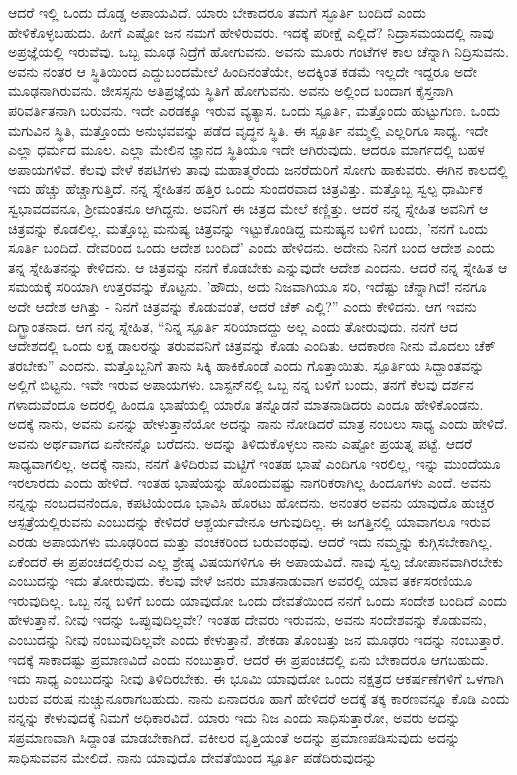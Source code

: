 ಆದರೆ ಇಲ್ಲಿ ಒಂದು ದೊಡ್ಡ ಅಪಾಯವಿದೆ. ಯಾರು ಬೇಕಾದರೂ ತಮಗೆ ಸ್ಫೂರ್ತಿ ಬಂದಿದೆ ಎಂದು ಹೇಳಿಕೊಳ್ಳಬಹುದು. ಹೀಗೆ ಎಷ್ಟೋ ಜನ ನಮಗೆ ಹೇಳಿರುವರು. ಇದಕ್ಕೆ ಪರೀಕ್ಷೆ ಎಲ್ಲಿದೆ? ನಿದ್ರಾಸಮಯದಲ್ಲಿ ನಾವು ಅಪ್ರಜ್ಞೆಯಲ್ಲಿ ಇರುವೆವು. ಒಬ್ಬ ಮೂಢ ನಿದ್ರೆಗೆ ಹೋಗುವನು. ಅವನು ಮೂರು ಗಂಟೆಗಳ ಕಾಲ ಚೆನ್ನಾಗಿ ನಿದ್ರಿಸುವನು. ಅವನು ನಂತರ ಆ ಸ್ಥಿತಿಯಿಂದ ಎದ್ದುಬಂದಮೇಲೆ ಹಿಂದಿನಂತೆಯೇ, ಅದಕ್ಕಿಂತ ಕಡಮೆ ಇಲ್ಲದೇ ಇದ್ದರೂ ಅದೇ ಮೂಢನಾಗಿರುವನು. ಜೀಸಸ್ಸನು ಅತಿಪ್ರಜ್ಞೆಯ ಸ್ಥಿತಿಗೆ ಹೋಗುವನು. ಅವನು ಅಲ್ಲಿಂದ ಬಂದಾಗ ಕೈಸ್ತನಾಗಿ ಪರಿವರ್ತಿತನಾಗಿ ಬರುವನು. ಇದೇ ಎರಡಕ್ಕೂ ಇರುವ ವ್ಯತ್ಯಾಸ. ಒಂದು ಸ್ಪೂರ್ತಿ, ಮತ್ತೊಂದು ಹುಟ್ಟುಗುಣ. ಒಂದು ಮಗುವಿನ ಸ್ಥಿತಿ, ಮತ್ತೊಂದು ಅನುಭವವನ್ನು ಪಡೆದ ವೃದ್ಧನ ಸ್ಥಿತಿ. ಈ ಸ್ಪೂರ್ತಿ ನಮ್ಮಲ್ಲಿ ಎಲ್ಲರಿಗೂ ಸಾಧ್ಯ. ಇದೇ ಎಲ್ಲಾ ಧರ್ಮದ ಮೂಲ. ಎಲ್ಲಾ ಮೇಲಿನ ಜ್ಞಾನದ ಸ್ಥಿತಿಯೂ ಇದೇ ಆಗಿರುವುದು. ಆದರೂ ಮಾರ್ಗದಲ್ಲಿ ಬಹಳ ಅಪಾಯಗಳಿವೆ. ಕೆಲವು ವೇಳೆ ಕಪಟಿಗಳು ತಾವು ಮಹಾತ್ಮರೆಂದು ಜನರೆದುರಿಗೆ ಸೋಗು ಹಾಕುವರು. ಈಗಿನ ಕಾಲದಲ್ಲಿ ಇದು ಹೆಚ್ಚು ಹೆಚ್ಚಾಗುತ್ತಿದೆ. ನನ್ನ ಸ್ನೇಹಿತನ ಹತ್ತಿರ ಒಂದು ಸುಂದರವಾದ ಚಿತ್ರವಿತ್ತು. ಮತ್ತೊಬ್ಬ ಸ್ವಲ್ಪ ಧಾರ್ಮಿಕ ಸ್ವಭಾವದವನೂ, ಶ‍್ರೀಮಂತನೂ ಆಗಿದ್ದನು. ಅವನಿಗೆ ಈ ಚಿತ್ರದ ಮೇಲೆ ಕಣ್ಣಿತ್ತು. ಆದರೆ ನನ್ನ ಸ್ನೇಹಿತ ಅವನಿಗೆ ಆ ಚಿತ್ರವನ್ನು ಕೊಡಲಿಲ್ಲ. ಮತ್ತೊಬ್ಬ ಮನುಷ್ಯ ಚಿತ್ರವನ್ನು ಇಟ್ಟುಕೊಂಡಿದ್ದ ಮನುಷ್ಯನ ಬಳಿಗೆ ಬಂದು, 'ನನಗೆ ಒಂದು ಸೂರ್ತಿ ಬಂದಿದೆ. ದೇವರಿಂದ ಒಂದು ಆದೇಶ ಬಂದಿದೆ' ಎಂದು ಹೇಳಿದನು. ಅದೇನು ನಿನಗೆ ಬಂದ ಆದೇಶ ಎಂದು ತನ್ನ ಸ್ನೇಹಿತನನ್ನು ಕೇಳಿದನು. ಆ ಚಿತ್ರವನ್ನು ನನಗೆ ಕೊಡಬೇಕು ಎನ್ನುವುದೇ ಆದೇಶ ಎಂದನು. ಆದರೆ ನನ್ನ ಸ್ನೇಹಿತ ಆ ಸಮಯಕ್ಕೆ ಸರಿಯಾಗಿ ಉತ್ತರವನ್ನು ಕೊಟ್ಟನು. 'ಹೌದು, ಅದು ನಿಜವಾಗಿಯೂ ಸರಿ, ಇದೆಷ್ಟು ಚೆನ್ನಾಗಿದೆ! ನನಗೂ ಅದೇ ಆದೇಶ ಆಗಿತ್ತು - ನಿನಗೆ ಚಿತ್ರವನ್ನು ಕೊಡುವಂತೆ, ಆದರೆ ಚೆಕ್ ಎಲ್ಲಿ?” ಎಂದು ಕೇಳಿದನು. ಆಗ ಇವನು ದಿಗ್ಭ್ರಾಂತನಾದ. ಆಗ ನನ್ನ ಸ್ನೇಹಿತ, “ನಿನ್ನ ಸ್ಪೂರ್ತಿ ಸರಿಯಾದದ್ದು ಅಲ್ಲ ಎಂದು ತೋರುವುದು. ನನಗೆ ಆದ ಆದೇಶದಲ್ಲಿ ಒಂದು ಲಕ್ಷ ಡಾಲರನ್ನು ತರುವವನಿಗೆ ಚಿತ್ರವನ್ನು ಕೊಡು ಎಂದಿತು. ಆದಕಾರಣ ನೀನು ಮೊದಲು ಚೆಕ್ ತರಬೇಕು'' ಎಂದನು. ಮತ್ತೊಬ್ಬನಿಗೆ ತಾನು ಸಿಕ್ಕಿ ಹಾಕಿಕೊಂಡೆ ಎಂದು ಗೊತ್ತಾಯಿತು. ಸ್ಪೂರ್ತಿಯ ಸಿದ್ದಾಂತವನ್ನು ಅಲ್ಲಿಗೆ ಬಿಟ್ಟನು. ಇವೇ ಇರುವ ಅಪಾಯಗಳು. ಬಾಸ್ಟನ್‌ನಲ್ಲಿ ಒಬ್ಬ ನನ್ನ ಬಳಿಗೆ ಬಂದು, ತನಗೆ ಕೆಲವು ದರ್ಶನ ಗಳಾದುವೆಂದೂ ಅದರಲ್ಲಿ ಹಿಂದೂ ಭಾಷೆಯಲ್ಲಿ ಯಾರೊ ತನ್ನೊಡನೆ ಮಾತನಾಡಿದರು ಎಂದೂ ಹೇಳಿಕೊಂಡನು. ಅದಕ್ಕೆ ನಾನು, ಅವನು ಏನನ್ನು ಹೇಳುತ್ತಾನೆಯೋ ಅದನ್ನು ನಾನು ನೋಡಿದರೆ ಮಾತ್ರ ನಂಬಲು ಸಾಧ್ಯ ಎಂದು ಹೇಳಿದೆ. ಅವನು ಅರ್ಥವಾಗದ ಏನೇನನ್ನೊ ಬರೆದನು. ಅದನ್ನು ತಿಳಿದುಕೊಳ್ಳಲು ನಾನು ಎಷ್ಟೋ ಪ್ರಯತ್ನ ಪಟ್ಟೆ. ಆದರೆ ಸಾಧ್ಯವಾಗಲಿಲ್ಲ. ಅದಕ್ಕೆ ನಾನು, ನನಗೆ ತಿಳಿದಿರುವ ಮಟ್ಟಿಗೆ ಇಂತಹ ಭಾಷೆ ಎಂದಿಗೂ ಇರಲಿಲ್ಲ, ಇನ್ನು ಮುಂದೆಯೂ ಇರಲಾರದು ಎಂದು ಹೇಳಿದೆ. ಇಂತಹ ಭಾಷೆಯನ್ನು ಹೊಂದುವಷ್ಟು ನಾಗರಿಕರಾಗಿಲ್ಲ ಹಿಂದೂಗಳು ಎಂದೆ. ಅವನು ನನ್ನನ್ನು ನಂಬದವನೆಂದೂ, ಕಪಟಿಯೆಂದೂ ಭಾವಿಸಿ ಹೊರಟು ಹೋದನು. ಅನಂತರ ಅವನು ಯಾವುದೊ ಹುಚ್ಚರ ಆಸ್ಪತ್ರೆಯಲ್ಲಿರುವನು ಎಂಬುದನ್ನು ಕೇಳಿದರೆ ಆಶ್ಚರ್ಯವೇನೂ ಆಗುವುದಿಲ್ಲ. ಈ ಜಗತ್ತಿನಲ್ಲಿ ಯಾವಾಗಲೂ ಇರುವ ಎರಡು ಅಪಾಯಗಳು ಮೂಢರಿಂದ ಮತ್ತು ವಂಚಕರಿಂದ ಬರುವಂಥವು. ಆದರೆ ಇದು ನಮ್ಮನ್ನು ಕುಗ್ಗಿಸಬೇಕಾಗಿಲ್ಲ. ಏಕೆಂದರೆ ಈ ಪ್ರಪಂಚದಲ್ಲಿರುವ ಎಲ್ಲ ಶ್ರೇಷ್ಠ ವಿಷಯಗಳಿಗೂ ಈ ಅಪಾಯವಿದೆ. ನಾವು ಸ್ವಲ್ಪ ಜೋಪಾನವಾಗಿರಬೇಕು ಎಂಬುದನ್ನು ಇದು ತೋರುವುದು. ಕೆಲವು ವೇಳೆ ಜನರು ಮಾತನಾಡುವಾಗ ಅವರಲ್ಲಿ ಯಾವ ತರ್ಕಸರಣಿಯೂ ಇರುವುದಿಲ್ಲ. ಒಬ್ಬ ನನ್ನ ಬಳಿಗೆ ಬಂದು ಯಾವುದೋ ಒಂದು ದೇವತೆಯಿಂದ ನನಗೆ ಒಂದು ಸಂದೇಶ ಬಂದಿದೆ ಎಂದು ಹೇಳುತ್ತಾನೆ. ನೀವು ಇದನ್ನು ಒಪ್ಪುವುದಿಲ್ಲವೇ? ಇಂತಹ ದೇವರು ಇರುವನು, ಅವನು ಸಂದೇಶವನ್ನು ಕೊಡುವನು, ಎಂಬುದನ್ನು ನೀವು ನಂಬುವುದಿಲ್ಲವೇ ಎಂದು ಕೇಳುತ್ತಾನೆ. ಶೇಕಡಾ ತೊಂಬತ್ತು ಜನ ಮೂಢರು ಇದನ್ನು ನಂಬುತ್ತಾರೆ. ಇದಕ್ಕೆ ಸಾಕಾದಷ್ಟು ಪ್ರಮಾಣವಿದೆ ಎಂದು ನಂಬುತ್ತಾರೆ. ಆದರೆ ಈ ಪ್ರಪಂಚದಲ್ಲಿ ಏನು ಬೇಕಾದರೂ ಆಗಬಹುದು. ಇದು ಸಾಧ್ಯ ಎಂಬುದನ್ನು ನೀವು ತಿಳಿದಿರಬೇಕು. ಈ ಭೂಮಿ ಯಾವುದೋ ಒಂದು ನಕ್ಷತ್ರದ ಆಕರ್ಷಣೆಗಳಿಗೆ ಒಳಗಾಗಿ ಬರುವ ವರುಷ ನುಚ್ಚುನೂರಾಗಬಹುದು. ನಾನು ಏನಾದರೂ ಹಾಗೆ ಹೇಳಿದರೆ ಅದಕ್ಕೆ ತಕ್ಕ ಕಾರಣವನ್ನೂ ಕೊಡಿ ಎಂದು ನನ್ನನ್ನು ಕೇಳುವುದಕ್ಕೆ ನಿಮಗೆ ಅಧಿಕಾರವಿದೆ. ಯಾರು ಇದು ನಿಜ ಎಂದು ಸಾಧಿಸುತ್ತಾರೋ, ಅವರು ಅದನ್ನು ಸಪ್ರಮಾಣವಾಗಿ ಸಿದ್ದಾಂತ ಮಾಡಬೇಕಾಗಿದೆ. ವಕೀಲರ ವೃತ್ತಿಯಂತೆ ಅದನ್ನು ಪ್ರಮಾಣಪಡಿಸುವುದು ಅದನ್ನು ಸಾಧಿಸುವವನ ಮೇಲಿದೆ. ನಾನು ಯಾವುದೊ ದೇವತೆಯಿಂದ ಸ್ಪೂರ್ತಿ ಪಡೆದಿರುವುದನ್ನು 